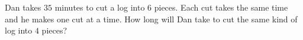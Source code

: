 Dan takes $35$ minutes to cut a log into $6$ pieces. Each cut takes the same time and he makes one cut at a time. How long will Dan take to cut the same kind of log into $4$ pieces?

